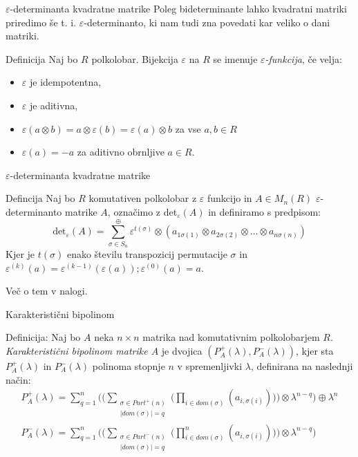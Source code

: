 \documentclass[t, 11pt]{beamer} %
\newcommand{\abs}[1]{\ensuremath{\lvert #1 \rvert}}
\newcommand{\pojem}[1]{\emph{#1}}
\newcommand{\fillblack}[1]{
\begin{tikzpicture}[remember picture, overlay]
    \node [shift={(0 cm,0cm)}]  at (current page.south west)
        {%
        \begin{tikzpicture}[remember picture, overlay] at (current page.south west)
            \draw [fill=black] (0, 0) -- (0,#1 \paperheight) --
                              (\paperwidth,#1 \paperheight) -- (\paperwidth,0) -- cycle ;
        \end{tikzpicture}
        };
        \draw (current page.north west) rectangle (current page.south east);
\end{tikzpicture}
}
\begin{document}
\begin{frame}{$\varepsilon$-determinanta kvadratne matrike}
	Poleg bideterminante lahko kvadratni matriki priredimo še t. i. $\varepsilon$-determinanto, ki nam tudi zna povedati kar veliko o dani matriki.
	\begin{block}{Definicija}
			Naj bo $R$ polkolobar. Bijekcija $\varepsilon$ na $R$ se imenuje \pojem{$\varepsilon$-funkcija}, če velja: \begin{itemize}
					\item $\varepsilon$ je idempotentna,
					\item $\varepsilon$ je aditivna,
					\item $\varepsilon(a\otimes b) = a\otimes \varepsilon(b) = \varepsilon(a)\otimes b$ za vse $a, b\in R$
					\item $\varepsilon(a) = -a$ za aditivno obrnljive $a\in R$.
				\end{itemize}
		\end{block}
\end{frame}
\begin{frame}{$\varepsilon$-determinanta kvadratne matrike}
\begin{block}{Defincija}
	Naj bo $R$ komutativen polkolobar z $\varepsilon$ funkcijo in $A\in M_n(R)$ $\varepsilon$-determinanto matrike $A$, označimo z det$_\varepsilon(A)$ in definiramo s predpisom: $$\text{det}_\varepsilon(A) = \sum_{\sigma\in S_n}^{\oplus} \varepsilon^{t(\sigma)}\otimes (a_{1\sigma(1)}\otimes a_{2\sigma(2)}\otimes\ldots\otimes a_{n\sigma(n)})$$
	Kjer je $t(\sigma)$ enako številu transpozicij permutacije $\sigma$ in $\varepsilon^{(k)}(a) = \varepsilon^{(k - 1)}(\varepsilon(a)); \varepsilon^{(0)}(a) = a$.
\end{block}

Več o tem v nalogi.

\end{frame}

\begin{frame}{Karakteristični bipolinom}
	\begin{block}{Definicija:}
		Naj bo $A$ neka $n\times n$ matrika nad komutativnim polkolobarjem $R$. \pojem{Karakteristični bipolinom matrike $A$} je dvojica $(P^{+}_A(\lambda), P^{-}_A(\lambda))$, kjer sta $P^{+}_A(\lambda)$ in $P^{-}_A(\lambda)$ polinoma stopnje $n$ v spremenljivki $\lambda$, definirana na naslednji način:
		\begin{align*}
			P^{+}_A(\lambda) = \sum_{q = 1}^{n}\bigg(\bigg( \sum_{\substack{\sigma\in Part^{+}(n) \\ \abs{dom(\sigma)} = q}} \bigg(\prod_{i\in dom(\sigma)} (a_{i, \sigma(i)})\bigg)\bigg) \otimes \lambda^{n-q}\bigg) \oplus \lambda^n \\
			P^{-}_A(\lambda) = \sum_{q = 1}^{n}\bigg(\bigg( \sum_{\substack{\sigma\in Part^{-}(n) \\ \abs{dom(\sigma)} = q}} \bigg(\prod_{i\in dom(\sigma)}^{n} (a_{i, \sigma(i)})\bigg)\bigg) \otimes \lambda^{n-q}\bigg)
		\end{align*}
	\end{block}
\end{frame}
\end{document}
